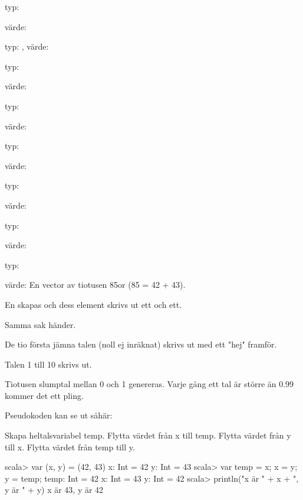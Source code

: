 \Subtask typ: 

värde: 

\Subtask typ: , värde: 

\Subtask typ: 

värde: 

\Task 

\Subtask typ: 

värde: 

\Subtask typ: 

värde: 

\Subtask typ: 

värde: 

\Subtask typ: 

värde: 

\Subtask typ: 

värde: En vector av tiotusen 85or (85 = 42 + 43).

\Task 

\Subtask En  skapas och dess element skrivs ut ett och ett.

\Subtask Samma sak händer.

\Subtask De tio första jämna talen (noll ej inräknat) skrivs ut med ett "hej" framför.

\Subtask Talen 1 till 10 skrivs ut.

\Subtask Tiotusen slumptal mellan 0 och 1 genereras. Varje gång ett tal är större än 0.99 kommer det ett pling.

\Task 

\Subtask Pseudokoden kan se ut såhär:

Skapa heltalsvariabel temp. 
Flytta värdet från x till temp. 
Flytta värdet från y till x. 
Flytta värdet från temp till y.

\Subtask
\begin{REPLnonum}
scala> var (x, y) = (42, 43)
x: Int = 42
y: Int = 43
scala> var temp = x; x = y; y = temp;
temp: Int = 42
x: Int = 43
y: Int = 42
scala> println("x är " + x + ", y är " + y)
x är 43, y är 42
\end{REPLnonum}

